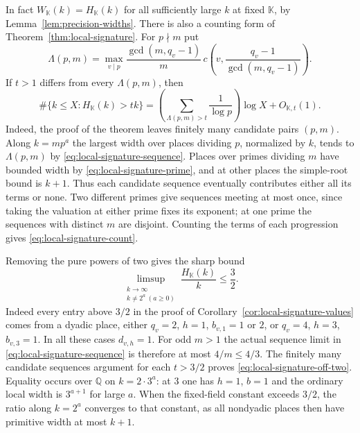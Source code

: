 \documentclass[11pt,letterpaper]{article}
\theoremstyle{definition}
\numberwithin{equation}{section}
\begin{document}
In fact $W_{\mathbb K}(k)=H_{\mathbb K}(k)$ for all sufficiently
large $k$ at fixed $\mathbb K$, by Lemma~\ref{lem:precision-widths}.
There is also a counting form of Theorem~\ref{thm:local-signature}.
For $p\nmid m$ put
\[
 \Lambda(p,m)=\max_{v\mid p}
   \frac{\gcd(m,q_v-1)}{m}\,
   c\left(v,\frac{q_v-1}{\gcd(m,q_v-1)}\right).
\]
If $t>1$ differs from every $\Lambda(p,m)$, then
\begin{equation}\label{eq:local-signature-count}
 \#\{k\le X:H_{\mathbb K}(k)>tk\}
    =\left(\sum_{\Lambda(p,m)>t}\frac{1}{\log p}\right)\log X
                                  +O_{\mathbb K,t}(1).
\end{equation}
Indeed, the proof of the theorem leaves finitely many candidate
pairs $(p,m)$. Along $k=mp^a$ the largest width over places dividing
$p$, normalized by $k$, tends to $\Lambda(p,m)$ by
\eqref{eq:local-signature-sequence}. Places over primes dividing
$m$ have bounded width by \eqref{eq:local-signature-prime}, and at
other places the simple-root bound is $k+1$. Thus each candidate
sequence eventually contributes either all its terms or none.
Two different primes give sequences meeting at most once, since
taking the valuation at either prime fixes its exponent; at one
prime the sequences with distinct $m$ are disjoint. Counting the
terms of each progression gives \eqref{eq:local-signature-count}.

Removing the pure powers of two gives the sharp bound
\begin{equation}\label{eq:local-signature-off-two}
       \limsup_{\substack{k\to\infty\\ k\ne2^a\ (a\ge0)}}
                  \frac{H_{\mathbb K}(k)}{k}\le\frac32 .
\end{equation}
Indeed every entry above $3/2$ in the proof of
Corollary~\ref{cor:local-signature-values} comes from a dyadic
place, either $q_v=2$, $h=1$, $b_{v,1}=1$ or $2$, or
$q_v=4$, $h=3$, $b_{v,3}=1$. In all these cases $d_{v,h}=1$.
For odd $m>1$ the actual sequence limit in
\eqref{eq:local-signature-sequence} is therefore at most $4/m\le4/3$.
The finitely many candidate sequences argument for each $t>3/2$
proves \eqref{eq:local-signature-off-two}. Equality occurs over
$\mathbb Q$ on $k=2\cdot3^a$: at $3$ one has $h=1$, $b=1$ and
the ordinary local width is $3^{a+1}$ for large $a$. When the
fixed-field constant exceeds $3/2$, the ratio along $k=2^a$
converges to that constant, as all nondyadic places then have
primitive width at most $k+1$.
\end{document}
